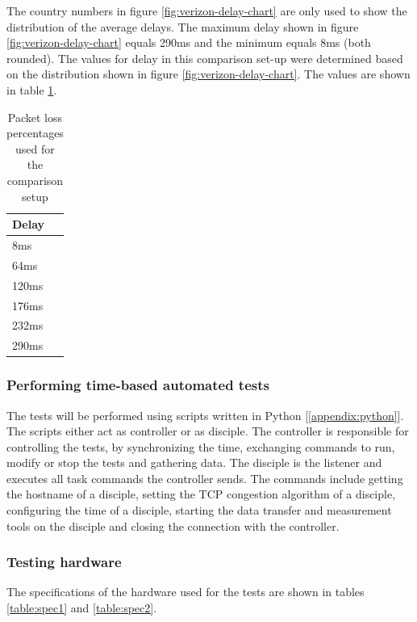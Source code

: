 \documentclass{article}
\begin{document}
The country numbers in figure \ref{fig:verizon-delay-chart} are only used to show the distribution of the average delays. The maximum delay shown in figure \ref{fig:verizon-delay-chart} equals 290ms and the minimum equals 8ms (both rounded). The values for delay in this comparison set-up were determined based on the distribution shown in figure \ref{fig:verizon-delay-chart}. The values are shown in table \ref{table:test-delay}.

\begin{table}[H]
	\centering
	\caption{Packet loss percentages used for the comparison setup}
	\begin{tabular}[H]{ | l |}
	\hline
	\textbf{Delay} \\
	\hline  8ms\\
	\hline  64ms  \\
	\hline  120ms  \\
	\hline  176ms \\
	\hline	232ms \\
	\hline  290ms  \\
	\hline
	\end{tabular}
	\label{table:test-delay}
\end{table}


\subsubsection{Performing time-based automated tests}

The tests will be performed using scripts written in Python [\ref{appendix:python}]. The scripts either act as controller or as disciple. The controller is responsible for controlling the tests, by synchronizing the time, exchanging commands to run, modify or stop the tests and gathering data. The disciple is the listener and executes all task commands the controller sends. The commands include getting the hostname of a disciple, setting the TCP congestion algorithm of a disciple, configuring the time of a disciple, starting the data transfer and measurement tools on the disciple and closing the connection with the controller.


\subsubsection{Testing hardware}

The specifications of the hardware used for the tests are shown in tables \ref{table:spec1} and \ref{table:spec2}.
\end{document}
